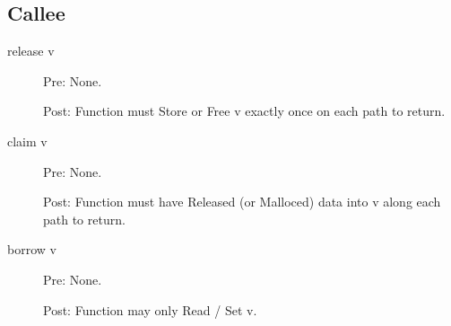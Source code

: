 \documentclass{article}
\begin{document}
\subsection{Callee}

\begin{description}


\item[release v]

Pre: None.

Post: Function must Store or Free v exactly once on each path to return.


\item[claim v]

Pre: None.

Post: Function must have Released (or Malloced) data into v along each path to
return.


\item[borrow v]

Pre: None.

Post: Function may only Read / Set v.

\end{description}
\end{document}
